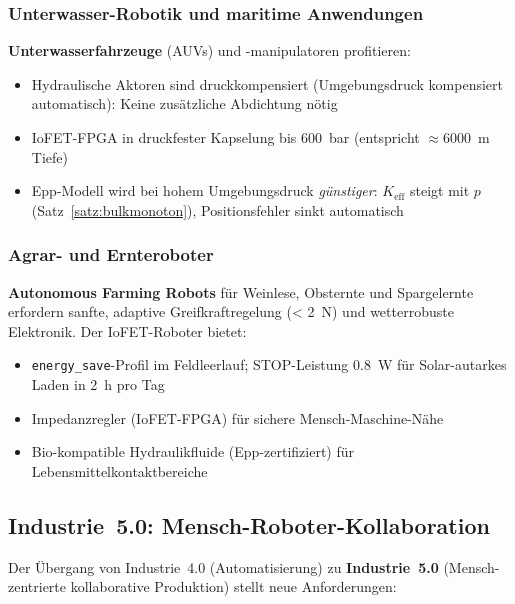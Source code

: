 ﻿\documentclass[a4paper,12pt]{scrreprt}
\theoremstyle{definition}
\begin{document}
\subsubsection{Unterwasser-Robotik und maritime Anwendungen}

\textbf{Unterwasserfahrzeuge} (AUVs) und -manipulatoren profitieren:
\begin{itemize}
  \item Hydraulische Aktoren sind druckkompensiert (Umgebungsdruck
        kompensiert automatisch): Keine zusätzliche Abdichtung nötig
  \item IoFET-FPGA in druckfester Kapselung bis \SI{600}{\bar}
        (entspricht $\approx$\SI{6000}{\meter} Tiefe)
  \item Epp-Modell wird bei hohem Umgebungsdruck \emph{günstiger}:
        $K_{\text{eff}}$ steigt mit $p$ (Satz~\ref{satz:bulkmonoton}),
        Positionsfehler sinkt automatisch
\end{itemize}

\subsubsection{Agrar- und Ernteroboter}

\textbf{Autonomous Farming Robots} für Weinlese, Obsternte und
Spargelernte erfordern sanfte, adaptive Greifkraftregelung
(\SI{< 2}{\newton}) und wetterrobuste Elektronik.
Der IoFET-Roboter bietet:
\begin{itemize}
  \item \texttt{energy\_save}-Profil im Feldleerlauf; STOP-Leistung \SI{0.8}{\watt}
        für Solar-autarkes Laden in 2~h pro Tag
  \item Impedanzregler (IoFET-FPGA) für sichere Mensch-Maschine-Nähe
  \item Bio-kompatible Hydraulikfluide (Epp-zertifiziert) für
        Lebensmittelkontaktbereiche
\end{itemize}

\subsection{Industrie~5.0: Mensch-Roboter-Kollaboration}

Der Übergang von Industrie~4.0 (Automatisierung) zu \textbf{Industrie~5.0}
(Mensch-zentrierte kollaborative Produktion) stellt neue Anforderungen:
\end{document}
